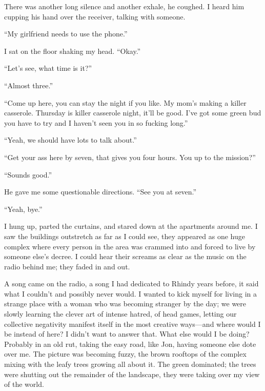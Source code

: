 There was another long silence and another exhale, he coughed. I heard
him cupping his hand over the receiver, talking with someone.

``My girlfriend needs to use the phone.''

I sat on the floor shaking my head. ``Okay.''

``Let's see, what time is it?''

``Almost three.''

``Come up here, you can stay the night if you like. My mom's making a
killer casserole. Thursday is killer casserole night, it'll be good.
I've got some green bud you have to try and I haven't seen you in so
fucking long.''

``Yeah, we should have lots to talk about.''

``Get your ass here by seven, that gives you four hours. You up to the
mission?''

``Sounds good.''

He gave me some questionable directions. ``See you at seven.''

``Yeah, bye.''

I hung up, parted the curtains, and stared down at the apartments around
me. I saw the buildings outstretch as far as I could see, they appeared
as one huge complex where every person in the area was crammed into and
forced to live by someone else's decree. I could hear their screams as
clear as the music on the radio behind me; they faded in and out.

A song came on the radio, a song I had dedicated to Rhindy years before,
it said what I couldn't and possibly never would. I wanted to kick
myself for living in a strange place with a woman who was becoming
stranger by the day; we were slowly learning the clever art of intense
hatred, of head games, letting our collective negativity manifest itself
in the most creative ways---and where would I be instead of here? I
didn't want to answer that. What else would I be doing? Probably in an
old rut, taking the easy road, like Jon, having someone else dote over
me. The picture was becoming fuzzy, the brown rooftops of the complex
mixing with the leafy trees growing all about it. The green dominated;
the trees were shutting out the remainder of the landscape, they were
taking over my view of the world.

